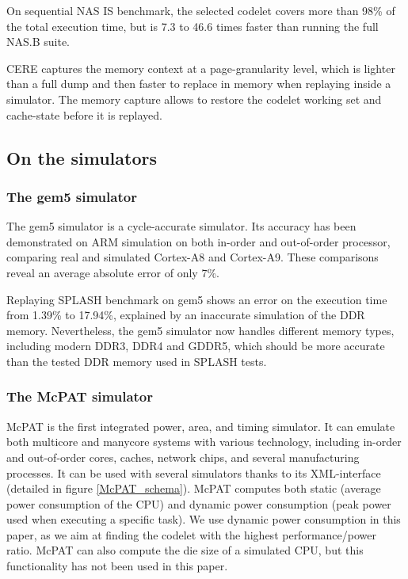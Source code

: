 \documentclass{article}
\begin{document}
\newpage

\begin{multicols}{2}
On sequential NAS IS benchmark, the selected codelet covers more than 98\% of the total execution time, but is 7.3 to 46.6 times faster than running the full NAS.B suite.



CERE captures the memory context at a page-granularity level, which is lighter than a full dump and then faster to replace in memory when replaying inside a simulator. The memory capture allows to restore the codelet working set and cache-state before it is replayed. 





\subsection{On the simulators}
\subsubsection*{The gem5 simulator}
The gem5 simulator is a cycle-accurate simulator. Its accuracy has been demonstrated on ARM simulation on both in-order and out-of-order processor, comparing real and simulated Cortex-A8 and Cortex-A9\cite{DBLP:conf/samos/EndoCC14}. These comparisons reveal an average absolute error of only 7\%.

Replaying SPLASH benchmark on gem5 shows an error on the execution time from 1.39\% to 17.94\%, explained by an inaccurate simulation of the DDR memory. Nevertheless, the gem5 simulator now handles different memory types, including modern DDR3, DDR4 and GDDR5, which should be more accurate than the tested DDR memory used in SPLASH tests\cite{DBLP:conf/recosoc/ButkoGOS12}.


\subsubsection*{The McPAT simulator}
McPAT is the first integrated power, area, and timing simulator. It can emulate both multicore and manycore systems with various technology, including in-order and out-of-order cores, caches, network chips, and several manufacturing processes. It can be used with several simulators thanks to its XML-interface (detailed in figure \ref{McPAT_schema}). McPAT computes both static (average power consumption of the CPU) and dynamic power consumption (peak power used when executing a specific task). We use dynamic power consumption in this paper, as we aim at finding the codelet with the highest performance/power ratio.
McPAT can also compute the die size of a simulated CPU, but this functionality has not been used in this paper.



\end{multicols}
\end{document}
